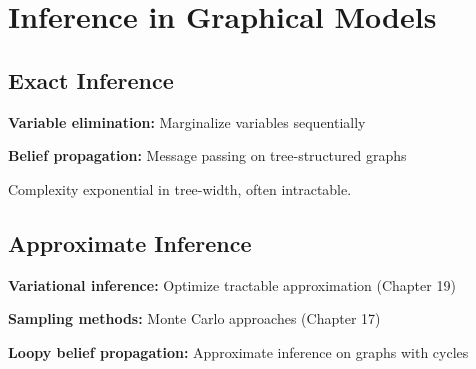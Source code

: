 
\section{Inference in Graphical Models}
\label{sec:inference}

\subsection{Exact Inference}

\textbf{Variable elimination:} Marginalize variables sequentially

\textbf{Belief propagation:} Message passing on tree-structured graphs

Complexity exponential in tree-width, often intractable.

\subsection{Approximate Inference}

\textbf{Variational inference:} Optimize tractable approximation (Chapter 19)

\textbf{Sampling methods:} Monte Carlo approaches (Chapter 17)

\textbf{Loopy belief propagation:} Approximate inference on graphs with cycles

